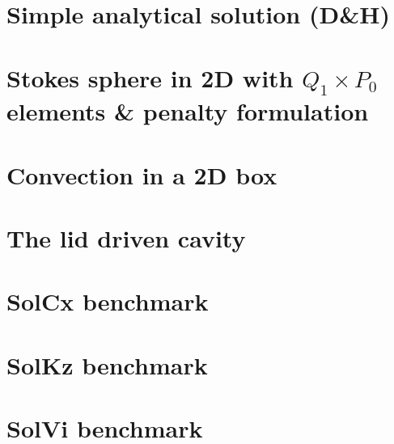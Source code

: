 \documentclass[a4paper,11pt]{report}
\begin{document}
\chapter{Simple analytical solution (D\&H) \label{f01}} %

\chapter{Stokes sphere in 2D with $Q_1\times P_0$ elements \& penalty formulation \label{f02}} %

\chapter{Convection in a 2D box \label{f03}} %

\chapter{The lid driven cavity \label{f04}} %

\chapter{SolCx benchmark \label{f05}} %

\chapter{SolKz benchmark \label{f06}} %

\chapter{SolVi benchmark \label{f07}} %
\end{document}

